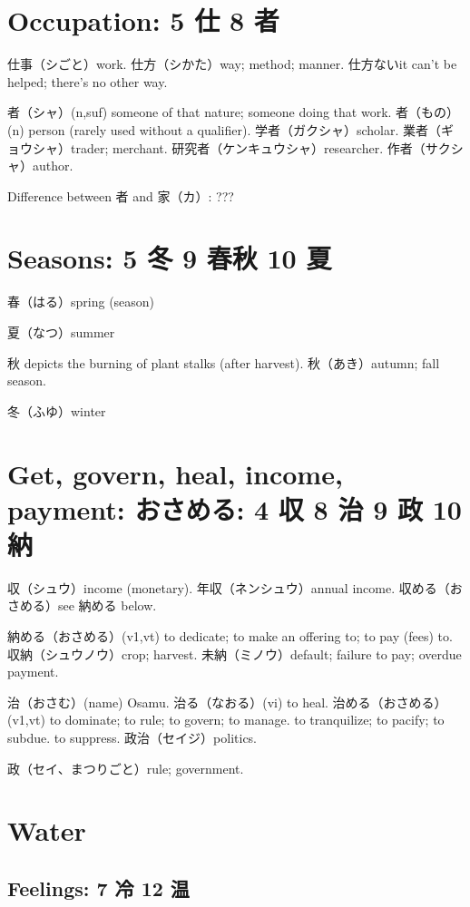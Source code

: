 \section{Occupation: 5 仕 8 者}

仕事（シごと）work.
仕方（シかた）way; method; manner.
仕方ないit can't be helped; there's no other way.

者（シャ）(n,suf) someone of that nature; someone doing that work.
者（もの）(n) person (rarely used without a qualifier).
学者（ガクシャ）scholar.
業者（ギョウシャ）trader; merchant.
研究者（ケンキュウシャ）researcher.
作者（サクシャ）author.

Difference between 者 and 家（カ）: ???

\section{Seasons: 5 冬 9 春秋 10 夏}

春（はる）spring (season)

夏（なつ）summer

秋 depicts the burning of plant stalks (after harvest).
秋（あき）autumn; fall season.

冬（ふゆ）winter

\section{Get, govern, heal, income, payment: おさめる: 4 収 8 治 9 政 10 納}

収（シュウ）income (monetary).
年収（ネンシュウ）annual income.
収める（おさめる）see 納める below.

納める（おさめる）(v1,vt)
to dedicate; to make an offering to; to pay (fees) to.
収納（シュウノウ）crop; harvest.
未納（ミノウ）default; failure to pay; overdue payment.

治（おさむ）(name) Osamu.
治る（なおる）(vi) to heal.
治める（おさめる）(v1,vt)
to dominate; to rule; to govern; to manage.
to tranquilize; to pacify; to subdue.
to suppress.
政治（セイジ）politics.

政（セイ、まつりごと）rule; government.

\section{Water}

\subsection{Feelings: 7 冷 12 温}

